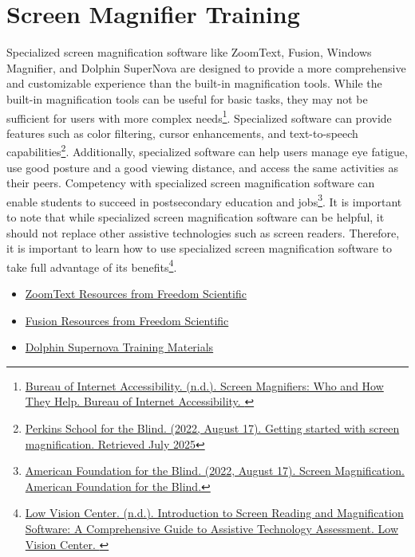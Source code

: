 \begin{itemize}
\hypertarget{appx11}{}\section[Screen Magnifier Training]{Screen Magnifier Training}\label{appx11}
Specialized screen magnification software like ZoomText, Fusion, Windows Magnifier, and Dolphin SuperNova are designed to provide a more comprehensive and customizable experience than the built-in magnification tools. While the built-in magnification tools can be useful for basic tasks, they may not be sufficient for users with more complex needs\footnote{\raggedright \href{https://www.boia.org/blog/screen-magnifiers-who-and-how-they-help}{Bureau of Internet Accessibility. (n.d.). Screen Magnifiers: Who and How They Help. Bureau of Internet Accessibility. }}. Specialized software can provide features such as color filtering, cursor enhancements, and text-to-speech capabilities\footnote{\raggedright \href{https://www.perkins.org/resource/getting-started-screen-magnification/}{Perkins School for the Blind. (2022, August 17). Getting started with screen magnification. Retrieved July 2025}}. Additionally, specialized software can help users manage eye fatigue, use good posture and a good viewing distance, and access the same activities as their peers. Competency with specialized screen magnification software can enable students to succeed in postsecondary education and jobs\footnote{\raggedright \href{https://www.afb.org/blindness-and-low-vision/using-technology/screen-magnification}{American Foundation for the Blind. (2022, August 17). Screen Magnification. American Foundation for the Blind.}}. It is important to note that while specialized screen magnification software can be helpful, it should not replace other assistive technologies such as screen readers. Therefore, it is important to learn how to use specialized screen magnification software to take full advantage of its benefits\footnote{\raggedright \href{https://nelowvision.com/introduction-to-screen-reading-and-magnification-software-a-comprehensive-guide-to-assistive-technology-assessment/}{Low Vision Center. (n.d.). Introduction to Screen Reading and Magnification Software: A Comprehensive Guide to Assistive Technology Assessment. Low Vision Center. }}.
\begin{itemize}
 \begin{itemize}
  \item \href{https://support.freedomscientific.com/teachers/resources/ZoomText\_resources.zip}{ZoomText Resources from Freedom Scientific}
  \item \href{https://support.freedomscientific.com/teachers/resources/Fusion\_resources.zip}{Fusion Resources from Freedom Scientific}
  \item \href{https://yourdolphin.com/support/tutorials}{Dolphin Supernova Training Materials}
 \end{itemize}


\end{itemize}
\end{itemize}
